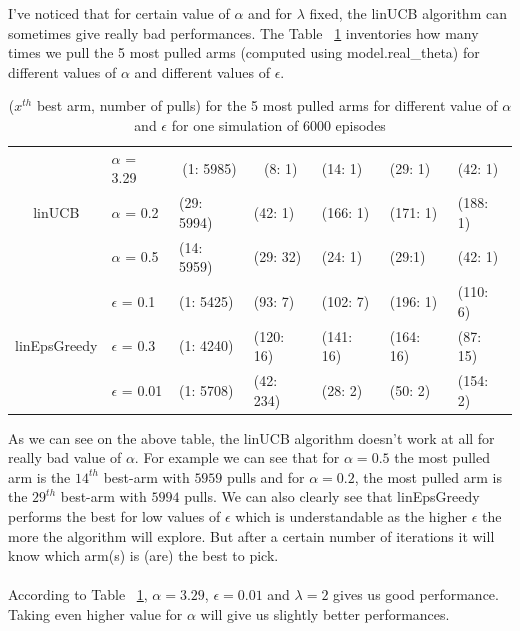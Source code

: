 \documentclass[11pt]{article}
\numberwithin{figure}{section} %
\begin{document}
I've noticed that for certain value of $\alpha$ and for $\lambda$ fixed, the linUCB algorithm can sometimes give really bad performances. The Table ~\ref{table:alpha_eps_perf} inventories 
how many times we pull the 5 most pulled arms (computed using model.real\_theta) for different values of $\alpha$ and different values of $\epsilon$.

\begin{table}[H]
\centering
\begin{tabular}{|c|l|l|l|l|l|l|}
\hline
\multirow{3}{*}{linUCB} & $\alpha$ = 3.29 & \multicolumn{1}{c|}{(1: 5985)} & \multicolumn{1}{c|}{(8: 1)} & (14: 1) & (29: 1) & (42: 1) \\ \cline{2-7} 
 & $\alpha$ = 0.2 & (29: 5994) & (42: 1) & (166: 1) & (171: 1) & (188: 1) \\ \cline{2-7} 
 & $\alpha$ = 0.5 & (14: 5959) & (29: 32) & (24: 1) & (29:1) & (42: 1) \\ \hline
\multirow{3}{*}{linEpsGreedy} & $\epsilon$ = 0.1 & (1: 5425) & (93: 7) & (102: 7) & (196: 1) & (110: 6) \\ \cline{2-7} 
 & $\epsilon$ = 0.3 & (1: 4240) & (120: 16) & (141: 16) & (164: 16) & (87: 15) \\ \cline{2-7} 
 & $\epsilon$ = 0.01 & (1: 5708) & (42: 234) & (28: 2) & (50: 2) & (154: 2) \\ \hline
\end{tabular}
\caption{($x^{th}$ best arm, number of pulls) for the 5 most pulled arms for different value of $\alpha$ and $\epsilon$ for one simulation of 6000 episodes}
\label{table:alpha_eps_perf}
\end{table}

As we can see on the above table, the linUCB algorithm doesn't work at all for really bad value of $\alpha$. For example we can see that for $\alpha = 0.5$ the
most pulled arm is the $14^{th}$ best-arm with $5959$ pulls and for $\alpha = 0.2$, the most pulled arm is the $29^{th}$ best-arm with $5994$ pulls. We can also clearly see that linEpsGreedy performs the best for low values of $\epsilon$ which is understandable as the higher $\epsilon$ the more the algorithm will explore. But after a certain number of iterations it will know which arm(s) is (are) the best to pick. \\
\\
According to Table ~\ref{table:alpha_eps_perf}, $\alpha = 3.29$, $\epsilon = 0.01$ and $\lambda = 2$ gives us good performance. Taking even higher value for $\alpha$ will give us slightly better performances.
\end{document}
